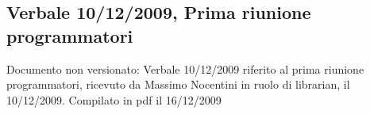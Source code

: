 \subsection{Verbale 10/12/2009, Prima riunione programmatori}
Documento non versionato: Verbale 10/12/2009 riferito al prima riunione
programmatori, ricevuto da Massimo Nocentini in ruolo di librarian, il
10/12/2009. Compilato in pdf il 16/12/2009
